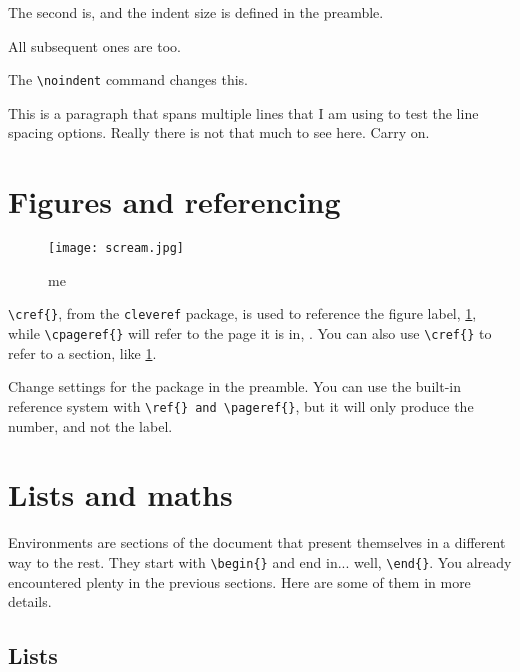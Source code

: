 \documentclass[12pt, letterpaper]{article} %
\begin{document}
The second is, and the indent size is defined in the preamble.

All subsequent ones are too.

\noindent The \verb+\noindent+ command changes this.\par

This is a paragraph that spans multiple lines that I am using to test the 
line spacing options. Really there is not that much to see here. Carry on.

\clearpage
\section{Figures and referencing} \label{sec:fig} %

\begin{figure}[h] %
    \centering %
    \texttt{[image: scream.jpg]} %
    \caption{me} %
    \label{fig:scream} %
\end{figure}

\verb+\cref{}+, from the \texttt{cleveref} package, is used to reference the 
figure label, \cref{fig:scream}, while \verb+\cpageref{}+ will refer to the 
page it is in, . You can also use \verb+\cref{}+ to refer 
to a section, like \cref{sec:fig}. 

Change settings for the package in the preamble. You can use the built-in 
reference system with \verb+\ref{} and \pageref{}+, but it will only produce 
the number, and not the label.

\clearpage
\section{Lists and maths}
Environments are sections of the document that present themselves 
in a different way to the rest. They start with \verb+\begin{}+ and end in... 
well, \verb+\end{}+. You already encountered plenty in the previous sections. 
Here are some of them in more details.

\subsection*{Lists}
\end{document}
